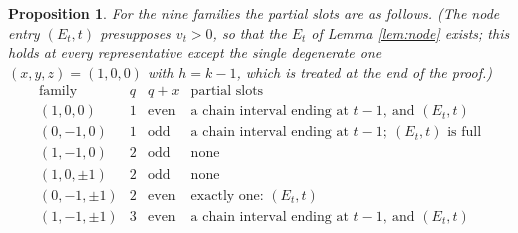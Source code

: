 \documentclass[reqno]{amsart}
\theoremstyle{plain}
\newtheorem{proposition}[theorem]{Proposition}
\theoremstyle{definition}
\begin{document}
\begin{proposition}\label{prop:partials}
For the nine families the partial slots are as follows.  \textup{(}The node
entry $(E_t,t)$ presupposes $v_t>0$, so that the $E_t$ of Lemma
\ref{lem:node} exists; this holds at every representative except the single
degenerate one $(x,y,z)=(1,0,0)$ with $h=k-1$, which is treated at the end of
the proof.\textup{)}
\[
\renewcommand{\arraystretch}{1.2}
\begin{array}{lccl}
\text{family} & q & q+x & \text{partial slots}\\\hline
(1,0,0) & 1 & \text{even} & \text{a chain interval ending at } t-1,\ \text{and } (E_t,t)\\
(0,-1,0) & 1 & \text{odd} & \text{a chain interval ending at } t-1;\ (E_t,t)\text{ is full}\\
(1,-1,0) & 2 & \text{odd} & \text{none}\\
(1,0,\pm1) & 2 & \text{odd} & \text{none}\\
(0,-1,\pm1) & 2 & \text{even} & \text{exactly one: } (E_t,t)\\
(1,-1,\pm1) & 3 & \text{even} & \text{a chain interval ending at } t-1,\ \text{and } (E_t,t)
\end{array}
\]
\end{proposition}
\end{document}
